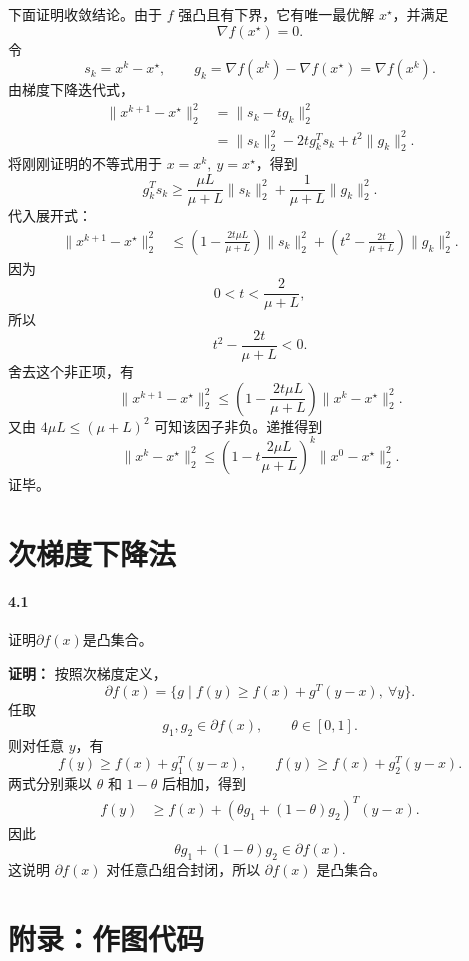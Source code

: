 \documentclass[12pt,a4paper]{article}
\begin{document}
下面证明收敛结论。由于 $f$ 强凸且有下界，它有唯一最优解 $x^\star$，并满足
\[
  \nabla f(x^\star)=0.
\]
令
\[
  s_k=x^k-x^\star,\qquad
  g_k=\nabla f(x^k)-\nabla f(x^\star)=\nabla f(x^k).
\]
由梯度下降迭代式，
\[
\begin{aligned}
  \|x^{k+1}-x^\star\|_2^2
  &=\|s_k-tg_k\|_2^2\\
  &=\|s_k\|_2^2-2t g_k^Ts_k+t^2\|g_k\|_2^2.
\end{aligned}
\]
将刚刚证明的不等式用于 $x=x^k,\ y=x^\star$，得到
\[
  g_k^Ts_k
  \geq
  \frac{\mu L}{\mu+L}\|s_k\|_2^2
  +\frac{1}{\mu+L}\|g_k\|_2^2.
\]
代入展开式：
\[
\begin{aligned}
  \|x^{k+1}-x^\star\|_2^2
  &\leq
  \left(1-\frac{2t\mu L}{\mu+L}\right)\|s_k\|_2^2
  +\left(t^2-\frac{2t}{\mu+L}\right)\|g_k\|_2^2.
\end{aligned}
\]
因为
\[
  0<t<\frac{2}{\mu+L},
\]
所以
\[
  t^2-\frac{2t}{\mu+L}<0.
\]
舍去这个非正项，有
\[
  \|x^{k+1}-x^\star\|_2^2
  \leq
  \left(1-\frac{2t\mu L}{\mu+L}\right)
  \|x^k-x^\star\|_2^2.
\]
又由 $4\mu L\leq(\mu+L)^2$ 可知该因子非负。递推得到
\[
  \|x^k-x^\star\|_2^2
  \leq
  \left(1-t\frac{2\mu L}{\mu+L}\right)^k
  \|x^0-x^\star\|_2^2.
\]
证毕。


\section{次梯度下降法}
\paragraph{4.1} 证明$\partial f(x)$是凸集合。 

\textbf{证明：}
按照次梯度定义，
\[
  \partial f(x)
  =
  \{g\mid f(y)\geq f(x)+g^T(y-x),\ \forall y\}.
\]
任取
\[
  g_1,g_2\in\partial f(x),\qquad \theta\in[0,1].
\]
则对任意 $y$，有
\[
  f(y)\geq f(x)+g_1^T(y-x),
  \qquad
  f(y)\geq f(x)+g_2^T(y-x).
\]
两式分别乘以 $\theta$ 和 $1-\theta$ 后相加，得到
\[
\begin{aligned}
  f(y)
  &\geq
  f(x)+\left(\theta g_1+(1-\theta)g_2\right)^T(y-x).
\end{aligned}
\]
因此
\[
  \theta g_1+(1-\theta)g_2\in\partial f(x).
\]
这说明 $\partial f(x)$ 对任意凸组合封闭，所以 $\partial f(x)$ 是凸集合。

\section*{附录：作图代码}

\end{document}
